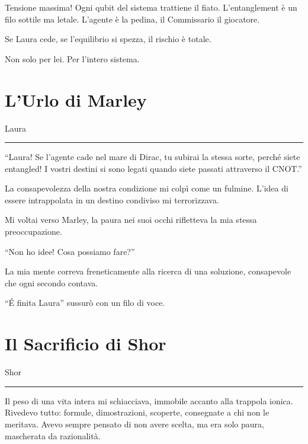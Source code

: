 Tensione massima! Ogni qubit del sistema trattiene il fiato. L’entanglement è un filo sottile ma letale. L’agente è la pedina, il Commissario il giocatore.

Se Laura cede, se l’equilibrio si spezza, il rischio è totale.

Non solo per lei. Per l’intero sistema.


\section{L'Urlo di Marley}
\vspace{1em}
\begin{center}Laura\end{center}
\hrule
\vspace{1em}


\begin{dialogue}
 \enquote{Laura! Se l'agente cade nel mare di Dirac, tu subirai la stessa sorte, perché siete entangled! I vostri destini si sono legati quando siete passati attraverso il CNOT.}
\end{dialogue}

La consapevolezza della nostra condizione mi colpì come un fulmine. L'idea di essere intrappolata in un destino condiviso mi terrorizzava.

Mi voltai verso Marley, la paura nei suoi occhi rifletteva la mia stessa preoccupazione.

\begin{dialogue}
 \enquote{Non ho idee! Cosa possiamo fare?}
\end{dialogue}

La mia mente correva freneticamente alla ricerca di una soluzione, consapevole che ogni secondo contava.

\begin{dialogue}
 \enquote{\'E finita Laura} sussurò con un filo di voce.
\end{dialogue}


\section{Il Sacrificio di Shor}

\vspace{1em}
\begin{center}Shor\end{center}
\hrule
\vspace{1em}

Il peso di una vita intera mi schiacciava, immobile accanto alla trappola ionica. Rivedevo tutto: formule, dimostrazioni, scoperte, consegnate a chi non le meritava. Avevo sempre pensato di non avere scelta, ma era solo paura, mascherata da razionalità.

